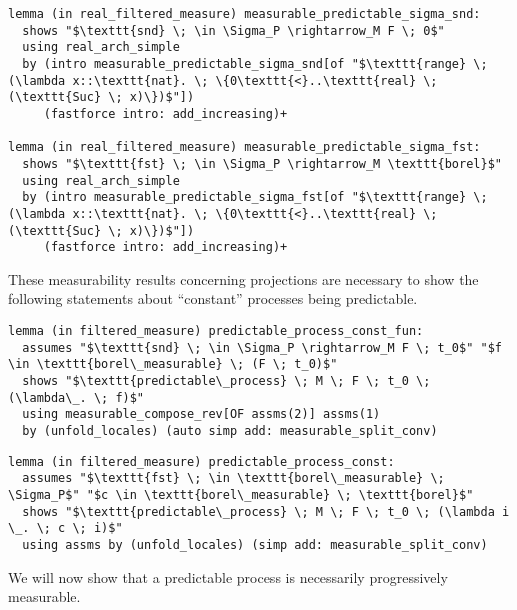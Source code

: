 \begin{isalemma}
{\small
\begin{lstlisting}[style=isabelle]
lemma (in real_filtered_measure) measurable_predictable_sigma_snd:
  shows "$\texttt{snd} \; \in \Sigma_P \rightarrow_M F \; 0$"
  using real_arch_simple 
  by (intro measurable_predictable_sigma_snd[of "$\texttt{range} \; (\lambda x::\texttt{nat}. \; \{0\texttt{<}..\texttt{real} \; (\texttt{Suc} \; x)\})$"]) 
	 (fastforce intro: add_increasing)+

lemma (in real_filtered_measure) measurable_predictable_sigma_fst:
  shows "$\texttt{fst} \; \in \Sigma_P \rightarrow_M \texttt{borel}$"
  using real_arch_simple 
  by (intro measurable_predictable_sigma_fst[of "$\texttt{range} \; (\lambda x::\texttt{nat}. \; \{0\texttt{<}..\texttt{real} \; (\texttt{Suc} \; x)\})$"])
	 (fastforce intro: add_increasing)+
\end{lstlisting}
}
\end{isalemma}

These measurability results concerning projections are necessary to show the following statements about ``constant'' processes being predictable.

\begin{isalemma}
{\small
\begin{lstlisting}[style=isabelle]
lemma (in filtered_measure) predictable_process_const_fun:
  assumes "$\texttt{snd} \; \in \Sigma_P \rightarrow_M F \; t_0$" "$f \in \texttt{borel\_measurable} \; (F \; t_0)$"
  shows "$\texttt{predictable\_process} \; M \; F \; t_0 \; (\lambda\_. \; f)$"
  using measurable_compose_rev[OF assms(2)] assms(1) 
  by (unfold_locales) (auto simp add: measurable_split_conv)
\end{lstlisting}
}
\end{isalemma}

\begin{isalemma}
{\small
\begin{lstlisting}[style=isabelle]
lemma (in filtered_measure) predictable_process_const:
  assumes "$\texttt{fst} \; \in \texttt{borel\_measurable} \; \Sigma_P$" "$c \in \texttt{borel\_measurable} \; \texttt{borel}$"
  shows "$\texttt{predictable\_process} \; M \; F \; t_0 \; (\lambda i \_. \; c \; i)$"
  using assms by (unfold_locales) (simp add: measurable_split_conv)
\end{lstlisting}
}
\end{isalemma}

We will now show that a predictable process is necessarily progressively measurable.

